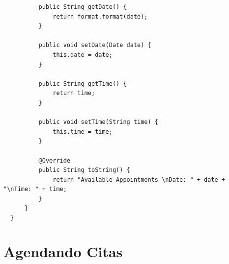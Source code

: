 \documentclass{article}
\begin{document}
\begin{verbatim}
          public String getDate() {
              return format.format(date);
          }

          public void setDate(Date date) {
              this.date = date;
          }

          public String getTime() {
              return time;
          }

          public void setTime(String time) {
              this.time = time;
          }

          @Override
          public String toString() {
              return "Available Appointments \nDate: " + date + "\nTime: " + time;
          }
      }
  }
\end{verbatim}


\section{Agendando Citas}%
\end{document}
